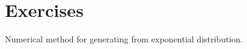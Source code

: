\FloatBarrier
{}
\section{Exercises}
Numerical method for generating from exponential distribution.

